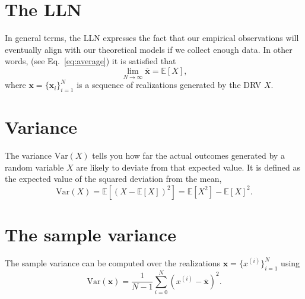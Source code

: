 
\section{The \acrlong{LLN}} %
\label{sec:LLN}
In general terms, the \gls{LLN} expresses the fact that our empirical
observations will eventually align with our theoretical models if we
collect enough data. In other words, (see Eq.~\ref{eq:average}) it is
satisfied that
\begin{equation}
  \lim_{N\rightarrow\infty}\overline{\bm{x}}=\mathbb{E}[X],
  \label{eq:LLN}
\end{equation}
where $\bm{x}=\{\bm{x}_i\}_{i=1}^{N}$ is a sequence of realizations
generated by the \gls{DRV} $X$.



\section{Variance}

\label{sec:variance}
The variance $\text{Var}(X)$ tells you how far the actual outcomes
generated by a random variable $X$ are likely to deviate from that
expected value. It is defined as the expected value of the squared
deviation from the mean,
\begin{equation}
  \text{Var}(X) = \mathbb{E}[(X - \mathbb{E}[X])^2] = \mathbb{E}[X^2]-\mathbb{E}[X]^2.
  \label{eq:variance}
\end{equation}


\section{The sample variance}

The sample variance can be computed over the realizations $\bm{x}=\{x^{(i)}\}_{i=1}^{N}$ using
\begin{equation}
  \text{Var}(\bm{x}) = \frac{1}{N-1}\sum_{i=0}^{N}(x^{(i)}-\overline{\bm{x}})^2.
\end{equation}



